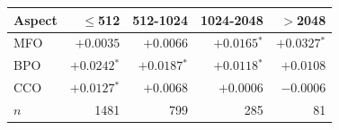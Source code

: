 \begin{tabular}{lrrrr}
\toprule
    \textbf{Aspect} & \textbf{$\leq$512} & \textbf{512-1024} & \textbf{1024-2048} & \textbf{$>$2048} \\
\midrule
    MFO & $+0.0035$ & $+0.0066$ & $+0.0165$$^{*}$ & $+0.0327$$^{*}$ \\
    BPO & $+0.0242$$^{*}$ & $+0.0187$$^{*}$ & $+0.0118$$^{*}$ & $+0.0108$ \\
    CCO & $+0.0127$$^{*}$ & $+0.0068$ & $+0.0006$ & $-0.0006$ \\
\midrule
    $n$ & 1481 & 799 & 285 & 81 \\
\bottomrule
\end{tabular}
